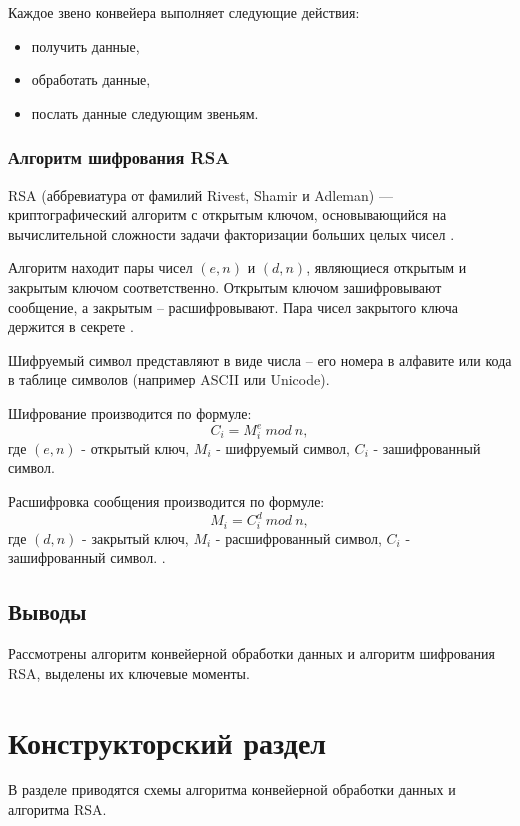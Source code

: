 \documentclass[a4paper,12pt]{article}
\begin{document}
Каждое звено конвейера выполняет следующие действия:

\begin{itemize}
\item     получить данные,

\item     обработать данные,

\item      послать данные следующим звеньям.
\end{itemize}

\subsubsection{Алгоритм шифрования RSA}
RSA (аббревиатура от фамилий Rivest, Shamir и Adleman) — криптографический алгоритм с открытым ключом, основывающийся на вычислительной сложности задачи факторизации больших целых чисел \cite{rsa_opr}.

Алгоритм находит пары чисел $(e, n) $ и $(d, n) $, являющиеся открытым и закрытым ключом соответственно. Открытым ключом зашифровывают сообщение, а закрытым – расшифровывают. Пара чисел закрытого ключа держится в секрете
\cite{rsa_opr}.

Шифруемый символ представляют в виде числа – его номера в алфавите или кода в таблице символов (например ASCII или Unicode).

Шифрование производится по формуле:
\[
	 C_i = M^e_i \: mod \: n,
\]
где $(e, n) $ - открытый ключ, $M_i$ - шифруемый символ, $C_i$ - зашифрованный символ. 

Расшифровка сообщения производится по формуле:
\[
	 M_i = C^d_i \: mod \: n,
\] 
где $(d, n) $ - закрытый ключ, $M_i$ - расшифрованный символ, $C_i$ - зашифрованный символ. \cite{rsa_alg}.
\subsection*{Выводы}

Рассмотрены алгоритм конвейерной обработки данных и алгоритм шифрования RSA, выделены их ключевые моменты. 
\newpage

\section{Конструкторский раздел}

В разделе приводятся схемы алгоритма конвейерной обработки данных и алгоритма RSA.
\end{document}
